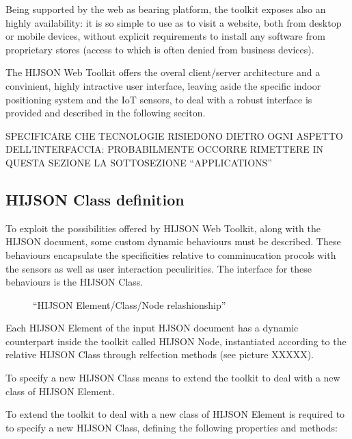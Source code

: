 \documentclass{sig-alternate}
\begin{document}
Being supported by the web as bearing platform, the toolkit exposes also
an highly availability: it is so simple to use as to visit a website,
both from desktop or mobile devices, without explicit requirements to
install any software from proprietary stores (access to which is often
denied from business devices).

The HIJSON Web Toolkit offers the overal client/server architecture and
a convinient, highly intractive user interface, leaving aside the
specific indoor positioning system and the IoT sensors, to deal with a
robust interface is provided and described in the following seciton.

SPECIFICARE CHE TECNOLOGIE RISIEDONO DIETRO OGNI ASPETTO
DELL'INTERFACCIA: PROBABILMENTE OCCORRE RIMETTERE IN QUESTA SEZIONE LA
SOTTOSEZIONE ``APPLICATIONS''

\subsection{HIJSON Class definition}\label{hijson-class-definition}

To exploit the possibilities offered by HIJSON Web Toolkit, along with
the HIJSON document, some custom dynamic behaviours must be described.
These behaviours encapsulate the specificities relative to comminucation
procols with the sensors as well as user interaction peculirities. The
interface for these behaviours is the HIJSON Class.

\begin{figure}[!htbp]
\centering
{}
\caption{``HIJSON Element/Class/Node relashionship''}
\label{fig:elem-class-node-rel}
\end{figure}

Each HIJSON Element of the input HJSON document has a dynamic
counterpart inside the toolkit called HIJSON Node, instantiated
according to the relative HIJSON Class through relfection methods (see
picture XXXXX).

To specify a new HIJSON Class means to extend the toolkit to deal with a
new class of HIJSON Element.

To extend the toolkit to deal with a new class of HIJSON Element is
required to to specify a new HIJSON Class, defining the following
properties and methods:
\end{document}
